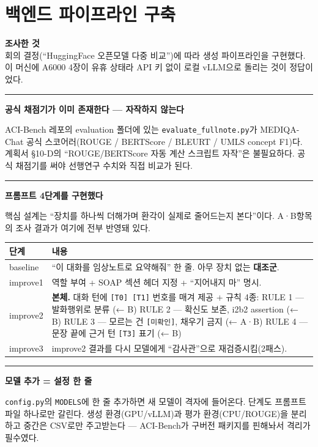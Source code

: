 \documentclass[10.5pt,a4paper]{article}
\renewcommand{\emph}[1]{{\color{muted}#1}}
\newcommand{\investigated}[1]{%
\begin{tcolorbox}[enhanced, blank, breakable,
  borderline west={2.2pt}{0pt}{rulegray},
  left=10pt, right=0pt, top=2pt, bottom=2pt, before skip=6pt, after skip=10pt]
{\footnotesize\bfseries\color{navy}조사한 것}\\[2pt]#1
\end{tcolorbox}}
\newcommand{\finding}[1]{%
\par\vspace{0.9em}\noindent
\textcolor{navy}{\rule[-0.05em]{2.4pt}{0.82em}}\hspace{0.55em}\textbf{#1}\par\nobreak\vspace{0.15em}}
\newcommand{\hl}[1]{\textbf{\color{accent}#1}}
\newcommand{\subhead}[1]{\par\vspace{1.0em}{\bfseries\color{navy}#1}\par\vspace{-0.15em}}
\begin{document}
\section{백엔드 파이프라인 구축}

\investigated{회의 결정(``HuggingFace 오픈모델 다중 비교'')에 따라 생성 파이프라인을 구현했다. 이 머신에 A6000 4장이 유휴 상태라 API 키 없이 로컬 vLLM으로 돌리는 것이 정답이었다.}

\subhead{확인된 사실 · 만든 것}

\finding{\hl{공식 채점기가 이미 존재한다 — 자작하지 않는다}}

ACI-Bench 레포의 evaluation 폴더에 있는 \texttt{evaluate\_fullnote.py}가 MEDIQA-Chat 공식 스코어러(ROUGE / BERTScore / BLEURT / UMLS concept F1)다. 계획서 §10-D의 ``ROUGE/BERTScore 자동 계산 스크립트 자작''은 불필요하다. 공식 채점기를 써야 선행연구 수치와 직접 비교가 된다.

\finding{프롬프트 4단계를 구현했다}

핵심 설계는 ``장치를 하나씩 더해가며 환각이 실제로 줄어드는지 본다''이다. A·B항목의 조사 결과가 여기에 전부 반영돼 있다.

\begin{center}\small
\begin{tabular}{@{}>{\ttfamily}lp{9.0cm}@{}}
\toprule
\rmfamily\textbf{단계} & \textbf{내용} \\
\midrule
baseline & ``이 대화를 임상노트로 요약해줘'' 한 줄. 아무 장치 없는 \textbf{대조군}. \\
improve1 & 역할 부여 + SOAP 섹션 헤더 지정 + ``지어내지 마'' 명시. \\
improve2 & \textbf{본체.} 대화 턴에 \texttt{[T0] [T1]} 번호를 매겨 제공 + 규칙 4종:
\newline RULE 1 — 발화행위로 분류 \emph{(← B)}
\newline RULE 2 — 확신도 보존, i2b2 assertion \emph{(← B)}
\newline RULE 3 — 모르는 건 \texttt{[미확인]}, 채우기 금지 \emph{(← A·B)}
\newline RULE 4 — 문장 끝에 근거 턴 \texttt{[T3]} 표기 \emph{(← B)} \\
improve3 & improve2 결과를 다시 모델에게 ``감사관''으로 재검증시킴(2패스). \\
\bottomrule
\end{tabular}
\end{center}

\finding{모델 추가 = 설정 한 줄}

\texttt{config.py}의 \texttt{MODELS}에 한 줄 추가하면 새 모델이 격자에 들어온다. 단계도 프롬프트 파일 하나로만 갈린다. 생성 환경(GPU/vLLM)과 평가 환경(CPU/ROUGE)을 분리하고 중간은 CSV로만 주고받는다 — ACI-Bench가 구버전 패키지를 핀해놔서 격리가 필수였다.
\end{document}

